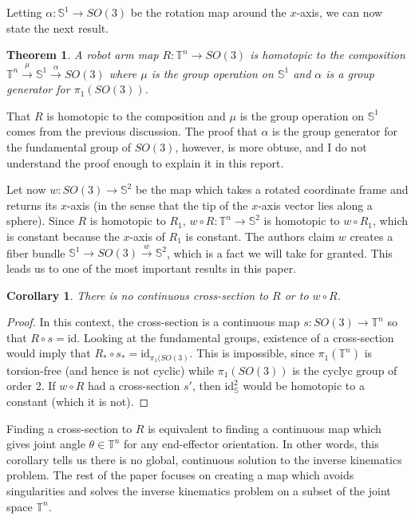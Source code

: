 \documentclass[12pt]{article}
\newtheorem{thm}{Theorem}
\newtheorem*{cor}{Corollary}
\theoremstyle{definition}
\begin{document}
Letting \(\alpha : \mathbb{S}^1 \rightarrow SO(3)\) be the rotation map around
the \(x\)-axis, we can now state the next result.
\begin{thm}
    A robot arm map \(R : \mathbb{T}^n \rightarrow SO(3)\) is homotopic to 
    the composition 
    \(\mathbb{T}^n \xrightarrow{\mu} \mathbb{S}^1 \xrightarrow{\alpha} SO(3)\)
    where \(\mu\) is the group operation on \(\mathbb{S}^1\) and \(\alpha\) is a
    group generator for \(\pi_1\left(SO(3)\right)\).
\end{thm}

That \(R\) is homotopic to the composition and \(\mu\) is the group operation on
\(\mathbb{S}^1\) comes from the previous discussion. The proof that \(\alpha\)
is the group generator for the fundamental group of \(SO(3)\), however, is more
obtuse, and I do not understand the proof enough to explain it in this report. 

Let now \(w : SO(3) \rightarrow \mathbb{S}^2\) be the map which takes a rotated
coordinate frame and returns its \(x\)-axis (in the sense that the tip of the
\(x\)-axis vector lies along a sphere).
Since \(R\) is homotopic to \(R_1\), 
\(w \circ R : \mathbb{T}^n \rightarrow \mathbb{S}^2\) is homotopic to 
\(w \circ R_1\), which is constant because the \(x\)-axis of \(R_1\) is
constant. The authors claim \(w\) creates a fiber bundle 
\(\mathbb{S}^1 \rightarrow SO(3) \xrightarrow{w} \mathbb{S}^2\), which is a fact
we will take for granted. This leads us to one of the most important results in
this paper.

\begin{cor}
    There is no continuous cross-section to \(R\) or to \(w \circ R\).
\end{cor}
\begin{proof}
    In this context, the cross-section is a continuous map 
    \(s : SO(3) \rightarrow \mathbb{T}^n\) so that \(R \circ s = \text{id}\). 
    Looking at the fundamental groups, existence of a cross-section would imply
    that \(R_* \circ s_* = \text{id}_{\pi_1(SO(3)}\). This is impossible, since
    \(\pi_1(\mathbb{T}^n)\) is torsion-free (and hence is not cyclic) while
    \(\pi_1(SO(3))\) is the cyclyc group of order 2. If \(w \circ R\) had a
    cross-section \(s'\), then \(\text{id}_\mathbb{S}^2\) would be homotopic to
    a constant (which it is not).
\end{proof}

Finding a cross-section to \(R\) is equivalent to finding a continuous map which
gives joint angle \(\theta \in \mathbb{T}^n\) for any end-effector orientation.
In other words, this corollary tells us there is no global, continuous solution
to the inverse kinematics problem. The rest of the paper focuses on creating a
map which avoids singularities and solves the inverse kinematics problem on a
subset of the joint space \(\mathbb{T}^n\).

\printbibliography
\end{document}
